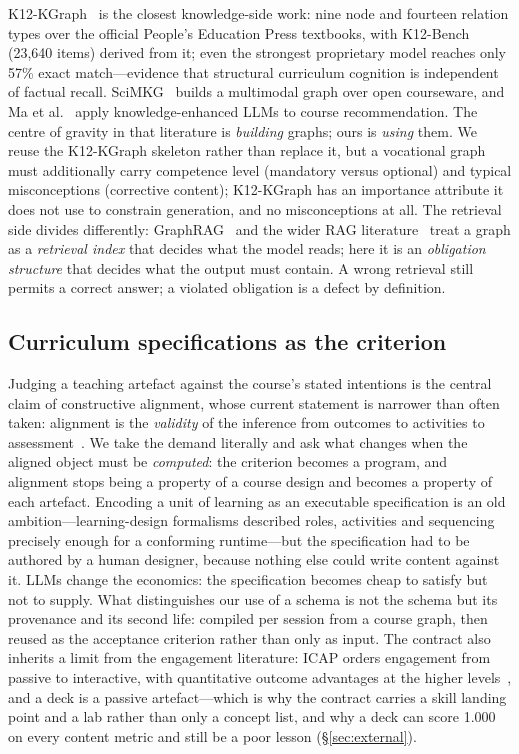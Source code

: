 \documentclass[review,12pt]{elsarticle}
\renewcommand{\_}{\kgunderscore\allowbreak}
\begin{document}
K12-KGraph~\cite{liang2026k12kgraph} is the closest knowledge-side work: nine
node and fourteen relation types over the official People's Education Press
textbooks, with K12-Bench (23{,}640 items) derived from it; even the strongest
proprietary model reaches only 57\% exact match---evidence that structural
curriculum cognition is independent of factual recall. SciMKG~\cite{lu2026scimkg}
builds a multimodal graph over open courseware, and Ma et
al.~\cite{ma2026ledlcm} apply knowledge-enhanced LLMs to course
recommendation. The centre of gravity in that literature is \emph{building}
graphs; ours is \emph{using} them. We reuse the K12-KGraph skeleton rather than
replace it, but a vocational graph must additionally carry competence
level (mandatory versus optional) and typical misconceptions
(corrective content); K12-KGraph has an importance attribute it does not use to
constrain generation, and no misconceptions at all. The retrieval side divides
differently: GraphRAG~\cite{edge2024graphrag} and the wider RAG
literature~\cite{huang2026ragsurvey,asai2024selfrag} treat a graph as a
\emph{retrieval index} that decides what the model reads; here it is an
\emph{obligation structure} that decides what the output must contain. A wrong
retrieval still permits a correct answer; a violated obligation is a defect by
definition.

\subsection{Curriculum specifications as the criterion}

Judging a teaching artefact against the course's stated intentions is the
central claim of constructive alignment, whose current statement is narrower
than often taken: alignment is the \emph{validity} of the inference from
outcomes to activities to assessment~\cite{santschi2026alignment,divjak2022learningdesign}.
We take the demand literally and ask what changes when the aligned object must
be \emph{computed}: the criterion becomes a program, and alignment stops being
a property of a course design and becomes a property of each artefact. Encoding
a unit of learning as an executable specification is an old
ambition---learning-design formalisms described roles, activities and
sequencing precisely enough for a conforming runtime---but the specification
had to be authored by a human designer, because nothing else could write
content against it. LLMs change the economics: the specification becomes cheap
to satisfy but not to supply. What distinguishes our use of a schema is not the
schema but its provenance and its second life: compiled per session from a
course graph, then reused as the acceptance criterion rather than only as
input. The contract also inherits a limit from the engagement literature: ICAP
orders engagement from passive to interactive, with quantitative outcome
advantages at the higher levels~\cite{wekerle2026icap,kozanitis2022active}, and
a deck is a passive artefact---which is why the contract carries a skill
landing point and a lab rather than only a concept list, and why a deck can
score 1.000 on every content metric and still be a poor lesson
(\S\ref{sec:external}).
\end{document}
